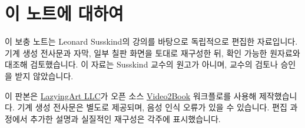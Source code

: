 \documentclass[11pt,oneside]{book}
\begin{document}
\frontmatter
\hypersetup{pageanchor=false}

\hypersetup{pageanchor=true}

\clearpage
\chapter{이 노트에 대하여}
이 보충 노트는 Leonard Susskind의 강의를 바탕으로 독립적으로 편집한 자료입니다. 기계 생성 전사문과 자막, 일부 칠판 화면을 토대로 재구성한 뒤, 확인 가능한 원자료와 대조해 검토했습니다. 이 자료는 Susskind 교수의 원고가 아니며, 교수의 검토나 승인을 받지 않았습니다.

이 판본은 \href{https://lazying.art}{LazyingArt LLC}가 오픈 소스 \href{https://github.com/lachlanchen/Video2Book}{Video2Book} 워크플로를 사용해 제작했습니다. 기계 생성 전사문은 별도로 제공되며, 음성 인식 오류가 있을 수 있습니다. 편집 과정에서 추가한 설명과 실질적인 재구성은 각주에 표시했습니다.
\clearpage
\tableofcontents
\mainmatter










\end{document}
